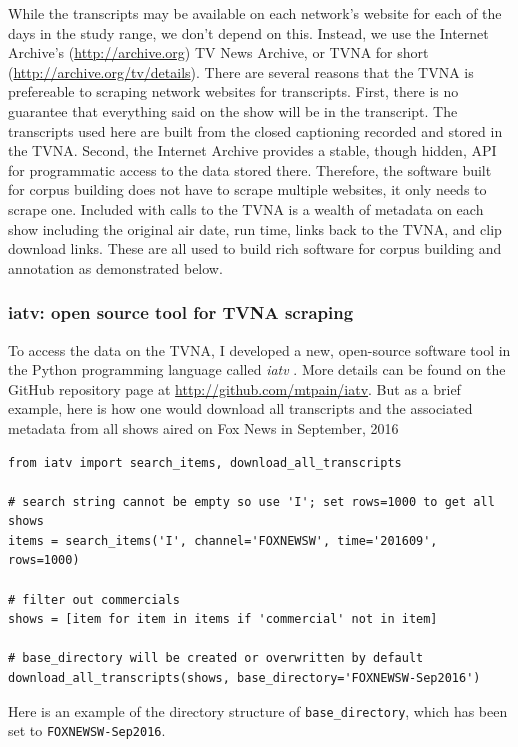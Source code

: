 While the transcripts may be available on each network's website 
for each of the days in the study range, we don't depend on this.
Instead, we use the Internet Archive's (\url{http://archive.org}) 
TV News Archive, or TVNA for short (\url{http://archive.org/tv/details}).
There are several reasons that the TVNA is prefereable to scraping network
websites for transcripts.
First, there is no guarantee that everything said on the show
will be in the transcript. The transcripts used here are built from the
closed captioning recorded and stored in the TVNA. 
Second, the Internet Archive provides a stable, though hidden, API for 
programmatic access to the data stored there. Therefore, the software built
for corpus building does not have to scrape multiple websites, it only needs to
scrape one. Included with calls to the TVNA is a wealth of metadata on each
show including the original air date, run time, links back to the TVNA, and
clip download links. These are all used to build rich software for corpus
building and annotation as demonstrated below.


\subsubsection{iatv: open source tool for TVNA scraping}
\label{subsec:iatv}

To access the data on the TVNA, I developed a new, open-source 
software tool in the Python programming language called \textit{iatv}
\cite{Turner2016}. More details can be found on the GitHub repository page
at \url{http://github.com/mtpain/iatv}. But as a brief example, here is
how one would download all transcripts and the associated metadata from
all shows aired on Fox News in September, 2016

\begin{verbatim}
from iatv import search_items, download_all_transcripts

# search string cannot be empty so use 'I'; set rows=1000 to get all shows 
items = search_items('I', channel='FOXNEWSW', time='201609', rows=1000)

# filter out commercials
shows = [item for item in items if 'commercial' not in item]

# base_directory will be created or overwritten by default
download_all_transcripts(shows, base_directory='FOXNEWSW-Sep2016')
\end{verbatim}

Here is an example of the directory structure of \texttt{base\_directory}, which
has been set to \texttt{FOXNEWSW-Sep2016}.

